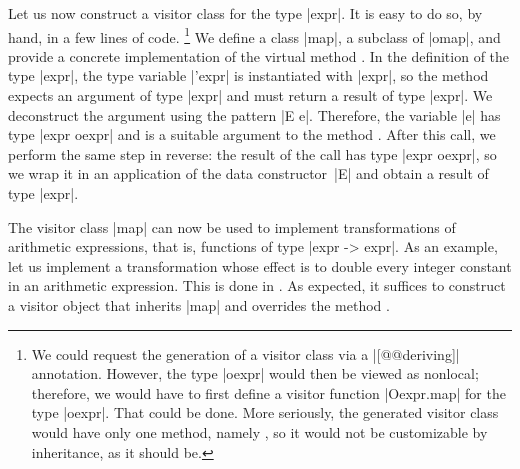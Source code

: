 \documentclass[11pt,a4paper,twoside]{article}
\begin{document}
Let us now construct a visitor class for the type \oc|expr|. It is easy to
do so, by hand, in a few lines of code.%
%
\footnote{We could request the generation of a visitor class via a
  \oc|[@@deriving]| annotation. However, the type \oc|oexpr| would then be
  viewed as nonlocal; therefore, we would have to first define a visitor
  function \oc|Oexpr.map| for the type \oc|oexpr|. That could be done. More
  seriously, the generated visitor class would have only one method, namely
  , so it would not be customizable by inheritance, as it
  should be.}
%
We define a class \oc|map|, a subclass of \oc|omap|, and provide a concrete
implementation of the virtual method . In the definition
of the type \oc|expr|, the type variable \oc|'expr| is instantiated with
\oc|expr|, so the method  expects an argument of type
\oc|expr| and must return a result of type \oc|expr|. We deconstruct the
argument using the pattern \oc|E e|. Therefore, the variable \oc|e| has type
\oc|expr oexpr| and is a suitable argument to the method .
After this call, we perform the same step in reverse: the result of the call
has type \oc|expr oexpr|, so we wrap it in an application of the data
constructor~\oc|E| and obtain a result of type \oc|expr|.

The visitor class \oc|map| can now be used to implement transformations of
arithmetic expressions, that is, functions of type \oc|expr -> expr|. As an
example, let us implement a transformation whose effect is to double every
integer constant in an arithmetic expression. This is done in
. As expected, it suffices to construct a visitor
object that inherits \oc|map| and overrides the method
.






\end{document}
